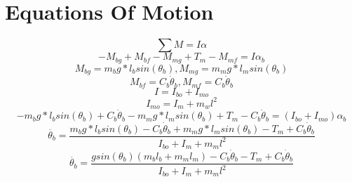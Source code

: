 \documentclass[12pt]{article}
\begin{document}
	\section{Equations Of Motion}
		\begin{equation}
			\sum M = I\alpha
		\end{equation}
		\begin{equation}
			-M_{bg}+M_{bf}-M_{mg}+T_m-M_{mf} = I\alpha_b
		\end{equation}
		\begin{equation}
			M_{bg} = m_b g*l_b sin(\theta_b), M_{mg} = m_m g*l_msin(\theta_b)
		\end{equation}
		\begin{equation}
			M_{bf} = C_b \dot{\theta}_b, M_{mf} = C_b \dot{\theta}_b
		\end{equation}
		\begin{equation}
			I = I_{bo} + I_{mo}
		\end{equation}
		\begin{equation}
			I_{mo} = I_m+m_wl^2
		\end{equation}
		\begin{equation}
			-m_b g*l_b sin(\theta_b) + C_b \dot{\theta}_b - m_m g*l_msin(\theta_b) + T_m - C_b \dot{\theta}_b = (I_{bo}+I_{mo})\alpha_b
		\end{equation}
		\begin{equation}
			\ddot{\theta_b} = \frac{m_b g*l_b sin(\theta_b) - C_b \dot{\theta}_b + m_m g*l_msin(\theta_b) - T_m + C_b \dot{\theta}_b}{I_{bo}+I_m+m_ml^2}
		\end{equation}
		\begin{equation}
			\ddot{\theta_b} = \frac{gsin(\theta_b)(m_bl_b + m_ml_m) - C_b \dot{\theta}_b - T_m + C_b \dot{\theta}_b}{I_{bo}+I_m+m_ml^2}
		\end{equation}
\end{document}
